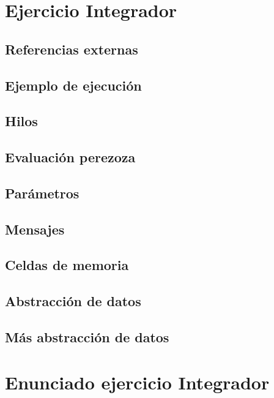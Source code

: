 \documentclass[12pt]{article}
\begin{document}
\tableofcontents

\clearpage

\section{Ejercicio Integrador}

\subsection{Referencias externas}

\subsection{Ejemplo de ejecución}

\subsection{Hilos}

\subsection{Evaluación perezoza}

\subsection{Parámetros}

\subsection{Mensajes}

\subsection{Celdas de memoria}

\subsection{Abstracción de datos}

\subsection{Más abstracción de datos}

\clearpage
\appendix

\section{Enunciado ejercicio Integrador}


\end{document}

